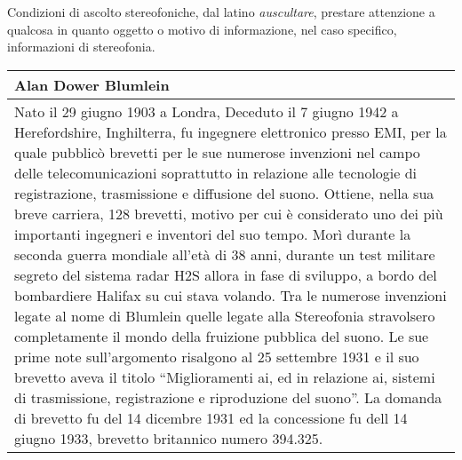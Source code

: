 Condizioni di ascolto stereofoniche, dal latino \emph{auscultare}, prestare
attenzione a qualcosa in quanto oggetto o motivo di informazione, nel caso specifico,
informazioni di stereofonia.

\vfill\null

\begin{table}[ht]
\footnotesize
\begin{tabular}{L{.969\textwidth}}%
\toprule
	\textbf{Alan Dower Blumlein}\\
\midrule
Nato il 29 giugno 1903 a Londra, Deceduto il 7 giugno 1942 a Herefordshire,
Inghilterra, fu ingegnere elettronico presso EMI, per la quale pubblicò brevetti
per le sue numerose invenzioni nel campo delle telecomunicazioni soprattutto in
relazione alle tecnologie di registrazione, trasmissione e diffusione del suono.
Ottiene, nella sua breve carriera, 128 brevetti, motivo per cui è considerato
uno dei più importanti ingegneri e inventori del suo tempo. Morì durante la
seconda guerra mondiale all'età di 38 anni, durante un test militare segreto del
sistema radar H2S allora in fase di sviluppo, a bordo del bombardiere Halifax
su cui stava volando. Tra le numerose invenzioni legate al nome di Blumlein
quelle legate alla Stereofonia stravolsero completamente il mondo della
fruizione pubblica del suono. Le sue prime note sull'argomento risalgono al 25
settembre 1931 e il suo brevetto aveva il titolo “Miglioramenti ai, ed in
relazione ai, sistemi di trasmissione, registrazione e riproduzione del suono”.
La domanda di brevetto fu del 14 dicembre 1931 ed la concessione fu dell
14 giugno 1933, brevetto britannico numero 394.325.\\
\bottomrule
\end{tabular}
\end{table}






